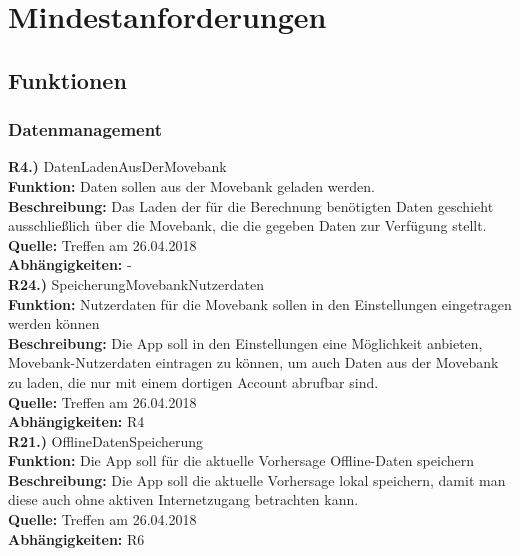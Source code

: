 \documentclass[12pt]{article} %
\begin{document}

\newpage
\section{Mindestanforderungen} \label{mindestanforderungen}


\subsection{Funktionen}

\subsubsection{Datenmanagement}

\textbf{R4.)} DatenLadenAusDerMovebank \\
\textbf{Funktion:} Daten sollen aus der Movebank geladen werden. \\
\textbf{Beschreibung:} Das Laden der für die Berechnung benötigten Daten geschieht ausschließlich über die Movebank, die die gegeben Daten zur Verfügung stellt. \\
\textbf{Quelle:} Treffen am 26.04.2018 \\
\textbf{Abhängigkeiten:} - \\

\textbf{R24.)} SpeicherungMovebankNutzerdaten \\
\textbf{Funktion:} Nutzerdaten für die Movebank sollen in den Einstellungen eingetragen werden können \\
\textbf{Beschreibung:} Die App soll in den Einstellungen eine Möglichkeit anbieten, Movebank-Nutzerdaten eintragen zu können, um auch Daten aus der Movebank zu laden, die nur mit einem dortigen Account abrufbar sind. \\
\textbf{Quelle:} Treffen am 26.04.2018 \\
\textbf{Abhängigkeiten:} R4 \\

\textbf{R21.)} OfflineDatenSpeicherung \\
\textbf{Funktion:} Die App soll für die aktuelle Vorhersage Offline-Daten speichern \\
\textbf{Beschreibung:} Die App soll die aktuelle Vorhersage lokal speichern, damit man diese auch ohne aktiven Internetzugang betrachten kann. \\
\textbf{Quelle:} Treffen am 26.04.2018 \\
\textbf{Abhängigkeiten:} R6 \\
\end{document}
